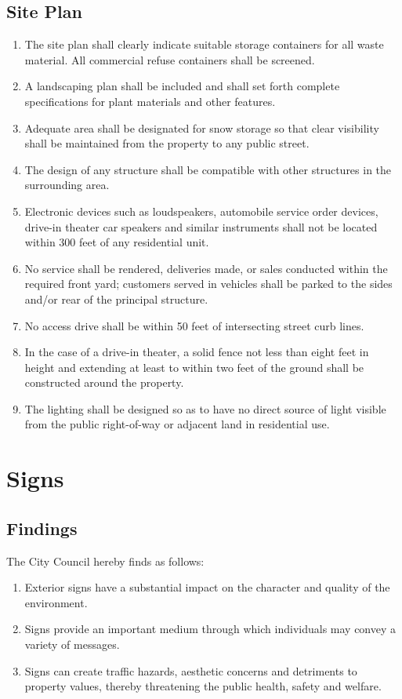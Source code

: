 \subsection{Site Plan}
\begin{enumerate}[{\indent}1)]
    \item The site plan shall clearly indicate suitable storage containers for all waste material.  All commercial refuse containers shall be screened.
    \item A landscaping plan shall be included and shall set forth complete specifications for plant materials and other features.
    \item Adequate area shall be designated for snow storage so that clear visibility shall be maintained from the property to any public street.
    \item The design of any structure shall be compatible with other structures in the surrounding area.
    \item Electronic devices such as loudspeakers, automobile service order devices, drive-in theater car speakers and similar instruments shall not be located within 300 feet of any residential unit.
    \item No service shall be rendered, deliveries made, or sales conducted within the required front yard; customers served in vehicles shall be parked to the sides and/or rear of the principal structure.
    \item No access drive shall be within 50 feet of intersecting street curb lines.
    \item In the case of a drive-in theater, a solid fence not less than eight feet in height and extending at least to within two feet of the ground shall be constructed around the property.
    \item The lighting shall be designed so as to have no direct source of light visible from the public right-of-way or adjacent land in residential use.
\end{enumerate}

\section{Signs}
\subsection{Findings}
The City Council hereby finds as follows:
\begin{enumerate}[{\indent}1)]
    \item Exterior signs have a substantial impact on the character and quality of the environment.
    \item Signs provide an important medium through which individuals may convey a variety of messages.
    \item Signs can create traffic hazards, aesthetic concerns and detriments to property values, thereby threatening the public health, safety and welfare.
\end{enumerate}

